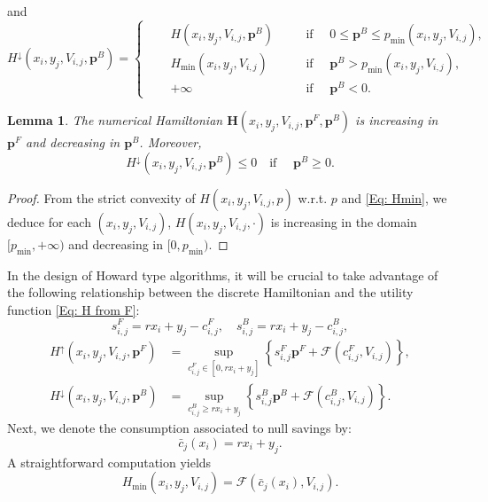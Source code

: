 \documentclass[11pt]{article}
\numberwithin{equation}{section}
\numberwithin{algorithm}{section}
\newtheorem{lemma}[lemma]{Lemma}
\newcommand{\lc}{\left(}
\newcommand{\rc}{\right)}
\newcommand{\beq}{\begin{equation}}
\newcommand{\eeq}{\end{equation}}
\theoremstyle{plain}
\begin{document}
and 
\begin{equation}\label{Eq: H down}
  {H}^{\downarrow} \lc x_i,y_j,V_{i,j},\boldsymbol{p}^{B}\rc=\left\{
      \begin{aligned}
      \quad &H\lc x_i,y_j,V_{i,j},\boldsymbol{p}^{B}\rc  \quad && \text{if }\quad 0\leq \boldsymbol{p}^{B}\leq {p}_{\min}\lc x_i,y_j,V_{i,j}\rc,\\
      &{H}_{\min}\lc x_i,y_j,V_{i,j}\rc \quad  && \text{if }\quad \boldsymbol{p}^{B}> {p}_{\min}\lc x_i,y_j,V_{i,j}\rc,\,\,\\
      &+\infty \quad  && \text{if }\quad \boldsymbol{p}^{B}<0.
     \end{aligned}
   \right.
\end{equation}
\begin{lemma}\label{Lemma: H monotone}
The numerical Hamiltonian $\boldsymbol{H}\lc x_i,y_j,V_{i,j},\boldsymbol{p}^{F},\boldsymbol{p}^{B}\rc$ is increasing in $\boldsymbol{p}^{F}$ and decreasing in $\boldsymbol{p}^{B}$. Moreover,
\beq\label{Eq: Hdown leq 0}
{H}^{\downarrow} \lc x_i,y_j,V_{i,j},\boldsymbol{p}^{B}\rc\leq 0\quad \text{if }\quad\boldsymbol{p}^{B}\geq 0.
\eeq
\end{lemma}
\begin{proof}
From the strict convexity of $H\lc x_i,y_j,V_{i,j},p\rc$ w.r.t. $p$ and \cref{Eq: Hmin}, we deduce for each $(x_i,y_j,V_{i,j})$, $H\lc x_i,y_j,V_{i,j},\cdot\rc$ is increasing in the domain $[{p}_{\min},+\infty)$ and decreasing in $[0,{p}_{\min})$. 
\end{proof}
In the design of Howard type algorithms, it will be crucial to take advantage of the following relationship between the discrete Hamiltonian and the utility function \cref{Eq: H from F}:
\beq\label{Eq: sF sB}
s^{F}_{i,j}=rx_i+y_j-c^{F}_{i,j},\quad s^{B}_{i,j}=rx_i+y_j-c^{B}_{i,j},
\eeq
\beq\label{Eq: H F in p}
      \begin{aligned}
{H}^{\uparrow}\lc x_i,y_j,V_{i,j},\boldsymbol{p}^{F}\rc&=\sup_{c^F_{i,j}\in [0,rx_i+y_j]}\left\{s^F_{i,j}\boldsymbol{p}^{F}+\mathcal{F}\lc c^F_{i,j},V_{i,j}\rc\right\},\\
{H}^{\downarrow} \lc x_i,y_j,V_{i,j},\boldsymbol{p}^{B}\rc&=\sup_{c^B_{i,j}\geq rx_i+y_j}\left\{s^B_{i,j}\boldsymbol{p}^{B}+\mathcal{F}\lc c^B_{i,j},V_{i,j}\rc\right\}.
\end{aligned}
\eeq
Next, we denote the consumption associated to null savings by:
\beq\label{Eq: def cbar}
\bar{c}_{j}(x_i)=rx_i+y_j.
\eeq
A straightforward computation yields
$$
{H}_{\min}\lc x_i,y_j,V_{i,j}\rc =\mathcal{F}\lc \bar{c}_{j}(x_i),V_{i,j}\rc.
$$\par
\end{document}
